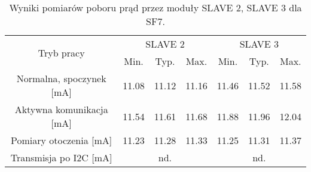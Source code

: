 \begin{table}[!htbp]
    \ContinuedFloat
    \centering
    \caption{\label{tab:power-usage-sf7b}Wyniki pomiarów poboru prąd przez moduły SLAVE 2, SLAVE 3 dla SF7.}
    \begin{tabular}{ccccccc}
        \toprule
        \multicolumn{1}{c}{\multirow{2}[4]{*}{Tryb pracy}} & \multicolumn{3}{c}{SLAVE 2} & \multicolumn{3}{c}{SLAVE 3}                                                                                                             \\
        \cmidrule{2-7}                                     & \multicolumn{1}{c}{Min.}    & \multicolumn{1}{c}{Typ.}    & \multicolumn{1}{c}{Max.} & \multicolumn{1}{c}{Min.} & \multicolumn{1}{c}{Typ.} & \multicolumn{1}{c}{Max.} \\
        \midrule
        Normalna, spoczynek [mA]                           & 11.08                       & 11.12                       & 11.16                    & 11.46                    & 11.52                    & 11.58                    \\
        \midrule
        Aktywna komunikacja [mA]                           & 11.54                       & 11.61                       & 11.68                    & 11.88                    & 11.96                    & 12.04                    \\
        \midrule
        Pomiary otoczenia [mA]                             & 11.23                       & 11.28                       & 11.33                    & 11.25                    & 11.31                    & 11.37                    \\
        \midrule
        Transmisja po I2C [mA]                             & \multicolumn{3}{c}{nd.}     & \multicolumn{3}{c}{nd.}                                                                                                                 \\
        \bottomrule
    \end{tabular}%
\end{table}